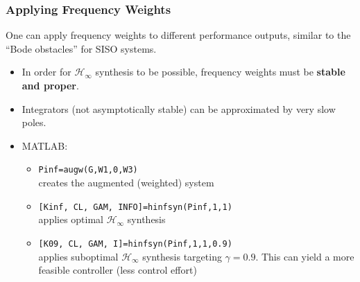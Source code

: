 \subsubsection{Applying Frequency Weights}
One can apply frequency weights to different performance outputs, similar to the ``Bode obstacles'' for SISO systems.
\begin{itemize}
    \item In order for $\mathcal{H}_\infty$ synthesis to be possible, frequency weights must be \textbf{stable and proper}.
    \item Integrators (not asymptotically stable) can be approximated by very slow poles.
    \item MATLAB:
          \begin{itemize}
              \item \texttt{Pinf=augw(G,W1,0,W3)}\\
                    creates the augmented (weighted) system
              \item \texttt{[Kinf, CL, GAM, INFO]=hinfsyn(Pinf,1,1)}\\
                    applies optimal $\mathcal{H}_\infty$ synthesis
              \item \texttt{[K09, CL, GAM, I]=hinfsyn(Pinf,1,1,0.9)}\\
                    applies suboptimal $\mathcal{H}_\infty$ synthesis targeting $\gamma=0.9$. This can yield a more feasible controller (less control effort)
          \end{itemize}
\end{itemize}